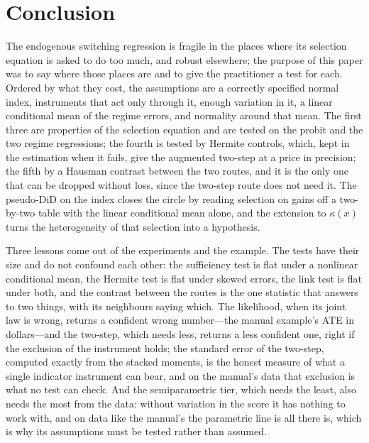\documentclass[11pt,a4paper]{article}
\theoremstyle{plain}
\theoremstyle{definition}
\theoremstyle{remark}
\newcommand{\1}{\mathbf{1}}
\begin{document}
\section{Conclusion}\label{sec:concl}

The endogenous switching regression is fragile in the places where its
selection equation is asked to do too much, and robust elsewhere; the
purpose of this paper was to say where those places are and to give
the practitioner a test for each. Ordered by what they cost, the
assumptions are a correctly specified normal index, instruments that
act only through it, enough variation in it, a linear conditional mean
of the regime errors, and normality around that mean. The first three
are properties of the selection equation and are tested on the probit
and the two regime regressions; the fourth is tested by Hermite
controls, which, kept in the estimation when it fails, give the
augmented two-step at a price in precision; the fifth by a Hausman
contrast between the two routes, and
it is the only one that can be dropped without loss, since the two-step
route does not need it. The pseudo-DiD on the index closes the circle
by reading selection on gains off a two-by-two table with the linear
conditional mean alone, and the extension to $\kappa(x)$ turns the
heterogeneity of that selection into a hypothesis.

Three lessons come out of the experiments and the example. The tests
have their size and do not confound each other: the sufficiency test is
flat under a nonlinear conditional mean, the Hermite test is flat under
skewed errors, the link test is flat under both, and the contrast
between the routes is the one statistic that answers to two things,
with its neighbours saying which. The likelihood, when its joint law is
wrong, returns a confident wrong number---the manual example's ATE in
dollars---and the two-step, which needs less, returns a less confident
one, right if the exclusion of the instrument holds; the standard error
of the two-step, computed exactly from the stacked moments, is the honest
measure of what a single indicator instrument can bear, and on the
manual's data that exclusion is what no test can check. And the semiparametric tier, which needs the least,
also needs the most from the data: without variation in the score it has
nothing to work with, and on data like the manual's the parametric line
is all there is, which is why its assumptions must be tested rather than
assumed.
\end{document}
